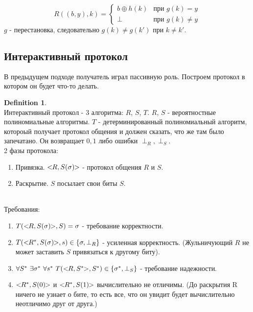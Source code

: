 \documentclass[a4paper]{article}
\theoremstyle{definition}
\newtheorem{definition}{Definition}
\theoremstyle{plain}
\begin{document}
$$
	R((b, y), k) = 
	\begin{cases}
   		b \oplus h(k) & \text{при } g(k) = y \\
   		\perp         & \text{при } g(k) \ne y
  	\end{cases}
$$
$g$ - перестановка, следовательно $g(k) \ne g(k')$ при $k \ne k'$.


\subsection{Интерактивный протокол}

В предыдущем подходе получатель играл пассивную роль.
Построем протокол в котором он будет что-то делать.~\\

\begin{definition}~\\
	Интерактивный протокол - 3 алгоритма: $R$, $S$, $T$. $R$, $S$ - вероятностные полиномиальные
	алгоритмы. $T$ - детерминированный полиномиальный алгоритм, котороый получает
	протокол общения и должен сказать, что же там было запечатано. Он возвращает
	$0, 1$ либо ошибки $\perp_R, \perp_S$.~\\

	2 фазы протокола: 
	\begin{enumerate}
		\item Привязка.
			$<\mkern-6mu R, S(\sigma) \mkern-6mu>$ - протокол общения $R$ и $S$.
		\item Раскрытие. $S$ посылает свои биты $S$.
	\end{enumerate}~\\
	
	Требования:
	\begin{enumerate}
		\item $T(<\mkern-6mu R, S(\sigma) \mkern-6mu>, S) = \sigma$ - требование корректности.
		\item $T(<\mkern-6mu R^*, S(\sigma) \mkern-6mu>, s) \in \{\sigma, \perp_R\}$ - усиленная корректность.
			(Жульничующий $R$ не может заставить $S$ привязаться к другому биту).
		\item $\forall S^*\ \exists \sigma^*\ \forall s^*\ T(<\mkern-6mu R, S^* \mkern-6mu>, S^*) \in \{\sigma^*, \perp_S\}$ - требование надежности.
		\item $<\mkern-6mu R^*, S(0) \mkern-6mu>$ и $<\mkern-6mu R^*, S(1) \mkern-6mu>$ вычислительно не отличимы. (До раскрытия R ничего не узнает о бите, то есть все, что он увидит будет вычислительно неотличимо друг от друга.)
	\end{enumerate}
\end{definition}
\end{document}
